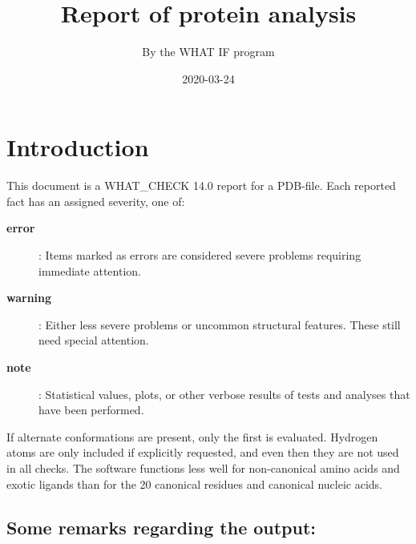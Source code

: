 \documentclass[a4paper]{article}
\begin{document}
\title{Report of protein analysis}
\author{By the WHAT IF program}

\date{2020-03-24}
\maketitle
\section{Introduction}

This document is a WHAT\_CHECK 14.0 report for a PDB-file. Each reported
fact has an assigned severity, one of:
\begin{description}
\item[{\bf error}]: Items
   marked as errors are considered severe problems requiring immediate
   attention.
\item[{\bf warning}]: Either less severe problems or uncommon structural
   features. These still need special attention.
\item[{\bf note}]: Statistical values, plots, or other verbose results of
   tests and analyses that have been performed.
\end{description}

If alternate conformations are present, only the first is
evaluated. Hydrogen atoms are only included if explicitly requested, and
even then they are not used in all checks. The software functions less well
for non-canonical amino acids and exotic ligands than for the 20 canonical
residues and canonical nucleic acids.

\subsection{Some remarks regarding the output:}
\end{document}
